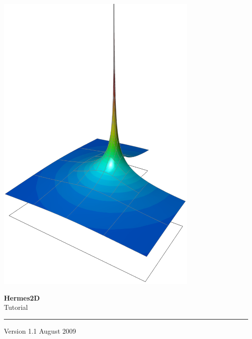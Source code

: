 

\pagestyle{empty}


\vspace*{0.8cm}

\begin{center}
\hspace{-8mm}\includegraphics[width=0.75\textwidth]{img/title.png}
\end{center}

\vspace{-0.3cm}

{\Huge\bf Hermes2D}\\[6mm]
{\LARGE Tutorial}\\[2mm]
\hrule

\vspace{3mm}
{\Large Version 1.1 \hfill August 2009}



\newpage
\pagestyle{plain}
